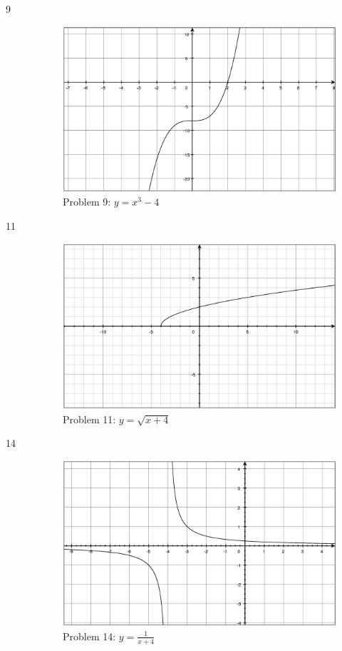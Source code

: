 \documentclass{exam}
\begin{document}
\begin{description}
    \item[9]
      \begin{figure}[H]
        \centering
        \includegraphics[scale=.3]{section_2.2/problem9.eps}
        \caption*{Problem 9: $y = x^3 - 4$}
      \end{figure}

    \item[11]
      \begin{figure}[H]
        \centering
        \includegraphics[scale=.3]{section_2.2/problem11.eps}
        \caption*{Problem 11: $y = \sqrt{x + 4}$}
      \end{figure}

    \item[14]
      \begin{figure}[H]
        \centering
        \includegraphics[scale=.3]{section_2.2/problem14.eps}
        \caption*{Problem 14: $y = \frac{1}{x + 4}$}
      \end{figure}


\end{description}
\end{document}
